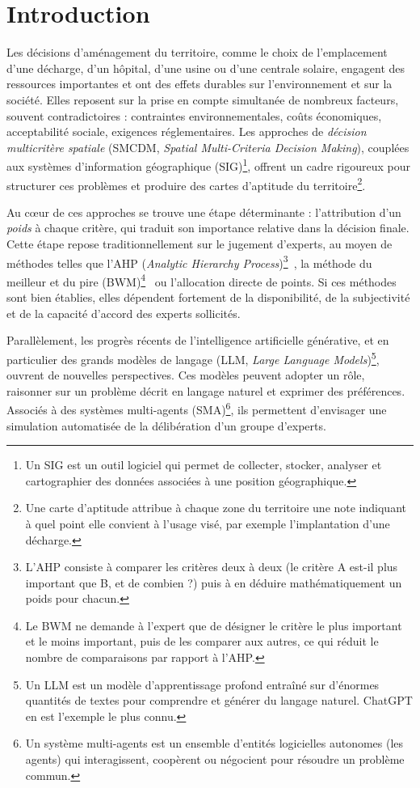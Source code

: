 \documentclass[11pt,a4paper]{article}
\begin{document}
\section{Introduction}

Les décisions d'aménagement du territoire, comme le choix de l'emplacement d'une décharge, d'un hôpital, d'une usine ou d'une centrale solaire, engagent des ressources importantes et ont des effets durables sur l'environnement et sur la société. Elles reposent sur la prise en compte simultanée de nombreux facteurs, souvent contradictoires : contraintes environnementales, coûts économiques, acceptabilité sociale, exigences réglementaires. Les approches de \emph{décision multicritère spatiale} (SMCDM, \emph{Spatial Multi-Criteria Decision Making}), couplées aux systèmes d'information géographique (SIG)\footnote{Un SIG est un outil logiciel qui permet de collecter, stocker, analyser et cartographier des données associées à une position géographique.}, offrent un cadre rigoureux pour structurer ces problèmes et produire des cartes d'aptitude du territoire\footnote{Une carte d'aptitude attribue à chaque zone du territoire une note indiquant à quel point elle convient à l'usage visé, par exemple l'implantation d'une décharge.}.

Au cœur de ces approches se trouve une étape déterminante : l'attribution d'un \emph{poids} à chaque critère, qui traduit son importance relative dans la décision finale. Cette étape repose traditionnellement sur le jugement d'experts, au moyen de méthodes telles que l'AHP (\emph{Analytic Hierarchy Process})\footnote{L'AHP consiste à comparer les critères deux à deux (le critère A est-il plus important que B, et de combien ?) puis à en déduire mathématiquement un poids pour chacun.}~\cite{saaty}, la méthode du meilleur et du pire (BWM)\footnote{Le BWM ne demande à l'expert que de désigner le critère le plus important et le moins important, puis de les comparer aux autres, ce qui réduit le nombre de comparaisons par rapport à l'AHP.}~\cite{rezaei} ou l'allocation directe de points. Si ces méthodes sont bien établies, elles dépendent fortement de la disponibilité, de la subjectivité et de la capacité d'accord des experts sollicités.

Parallèlement, les progrès récents de l'intelligence artificielle générative, et en particulier des grands modèles de langage (LLM, \emph{Large Language Models})\footnote{Un LLM est un modèle d'apprentissage profond entraîné sur d'énormes quantités de textes pour comprendre et générer du langage naturel. ChatGPT en est l'exemple le plus connu.}, ouvrent de nouvelles perspectives. Ces modèles peuvent adopter un rôle, raisonner sur un problème décrit en langage naturel et exprimer des préférences. Associés à des systèmes multi-agents (SMA)\footnote{Un système multi-agents est un ensemble d'entités logicielles autonomes (les agents) qui interagissent, coopèrent ou négocient pour résoudre un problème commun.}, ils permettent d'envisager une simulation automatisée de la délibération d'un groupe d'experts.
\end{document}
